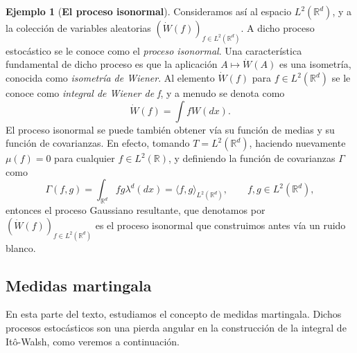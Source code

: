 \documentclass[letterpaper,twoside,12pt]{book}
\newcommand{\R}{\mathbb{R}}
\newcommand{\W}{\dot{W}}
\newcommand{\1}{\mathds{1}}
\theoremstyle{definition}
\theoremstyle{definition}
\theoremstyle{definition}
\theoremstyle{definition}
\theoremstyle{definition}
\theoremstyle{definition}
\newtheorem{ejem}{Ejemplo}
\theoremstyle{definition}
\begin{document}
\begin{ejem}[\textbf{El proceso isonormal}]
Consideramos así al espacio $L^{2}(\R^{d})$, y a la colección de variables aleatorias $(\W(f))_{f\in L^{2}(\R^{d})}$. A dicho proceso estocástico se le conoce como el \textit{proceso isonormal}. Una característica fundamental de dicho proceso es que la aplicación $A\mapsto\W(A)$ es una isometría, conocida como \textit{isometría de Wiener}. Al elemento $\W(f)$ para $f\in L^2(\R^{d})$ se le conoce como \textit{integral de Wiener de f}, y a menudo se denota como
\[
\W(f)=\int f W(dx).    
\] 
El proceso isonormal se puede también obtener vía su función de medias y su función de covarianzas. En efecto, tomando $T=L^{2}(\R^{d})$, haciendo nuevamente $\mu(f)=0$ para cualquier $f\in L^2(\R)$, y definiendo la función de covarianzas $\Gamma$ como
\[
\Gamma(f,g)=\int_{\R^d}fg \lambda^d(dx)=\langle f,g\rangle_{L^{2}(\R^{d})}, \qquad f,g\in L^2(\R^{d}),
\]
entonces el proceso Gaussiano resultante, que denotamos por $(\W(f))_{f\in L^{2}(\R^{d})}$ es el proceso isonormal que construimos antes vía un ruido blanco. 
 \end{ejem}

\subsection{Medidas martingala}

En esta parte del texto, estudiamos el concepto de medidas martingala. Dichos procesos estocásticos son una pierda angular en la construcción de la integral de Itô-Walsh, como veremos a continuación.
\end{document}
